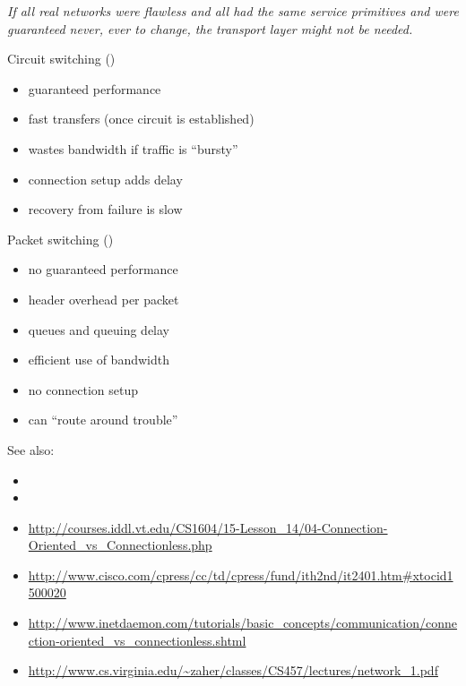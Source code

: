   \emph{If all real networks were flawless and all had the same service primitives and
    were guaranteed never, ever to change, the transport layer might not be needed.}

\begin{frame}{\quad {}\quad {}}
  \begin{minipage}[t]{.47\linewidth}
    \begin{iblock}{Circuit switching ()}
      \begin{itemize}
      \item[\good] guaranteed performance
      \item[\good] fast transfers (once circuit is established)
      \item[\textcolor{red}{\bad}] wastes bandwidth if traffic is ``bursty''
      \item[\textcolor{red}{\bad}] connection setup adds delay
      \item[\textcolor{red}{\bad}] recovery from failure is slow
      \end{itemize}
    \end{iblock}
  \end{minipage}\hfill
  \begin{minipage}[t]{.47\linewidth}
    \begin{iblock}{Packet switching ()}
      \begin{itemize}
      \item[\textcolor{red}{\bad}] no guaranteed performance
      \item[\textcolor{red}{\bad}] header overhead per packet
      \item[\textcolor{red}{\bad}] queues and queuing delay
      \item[\good] efficient use of bandwidth
      \item[\good] no connection setup
      \item[\good] can ``route around trouble''
      \end{itemize}
    \end{iblock}
  \end{minipage}
\end{frame}

See also:
\begin{itemize}
\item {}
\item {}
\item
  \url{http://courses.iddl.vt.edu/CS1604/15-Lesson_14/04-Connection-Oriented_vs_Connectionless.php}
\item \url{http://www.cisco.com/cpress/cc/td/cpress/fund/ith2nd/it2401.htm#xtocid1500020}
\item
  \url{http://www.inetdaemon.com/tutorials/basic_concepts/communication/connection-oriented_vs_connectionless.shtml}
\item \url{http://www.cs.virginia.edu/~zaher/classes/CS457/lectures/network_1.pdf}
\end{itemize}


